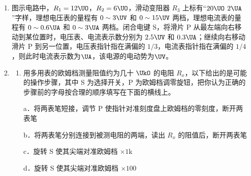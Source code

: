 \documentclass[\gkver]{gaokaozhenti}
\begin{document}
\begin{enumerate}
\item
图示电路中，$R_{1} = 12\UO$，$R_{2} = 6\UO$，滑动变阻器 $R_{3}$ 上标有“$20\UO$ $2\UA$”字样，理想电压表的量程有 $0 \sim 3\UV$ 和 $0 \sim 15\UV$ 两档，理想电流表的量程有 $0 \sim 0.6\UA$ 和 $0 \sim 3\UA$ 两档。闭合电键 S，将滑片 P 从最左端向右移动到某位置时，电压表、电流表示数分别为 $2.5\UV$ 和 $0.3\UA$；继续向右移动滑片 P 到另一位置，电压表指针指在满偏的 $1/3$，电流表指针指在满偏的 $1/4$，则此时电流表示数为$\UA$，该电源的电动势为$\UV$。
\onepicture[align=right, w=5.58cm]{}

\item
\begin{enumerate}
	\item
	用多用表的欧姆档测量阻值约为几十 $\UkO$ 的电阻 $R_{x}$，以下给出的是可能的操作步骤，其中 S 为选择开关，P 为欧姆档调零旋钮，把你认为正确的步骤前的字母按合理的顺序填写在下面的横线上。


	a．将两表笔短接，调节 P 使指针对准刻度盘上欧姆档的零刻度，断开两表笔

	b．将两表笔分别连接到被测电阻的两端，读出 $R_{x}$ 的阻值后，断开两表笔

	c．旋转 S 使其尖端对准欧姆档 $\times 1\mathrm{k}$

	d．旋转 S 使其尖端对准欧姆档 $\times 100$


\end{enumerate}
\end{enumerate}
\end{document}
